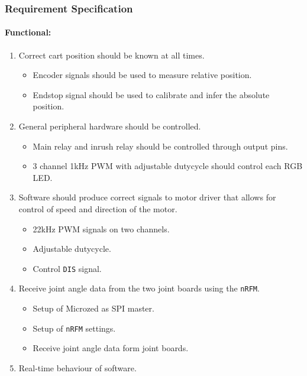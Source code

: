 \subsubsection{Requirement Specification} %
\label{ssub:controller_requirements}

\paragraph{Functional:}
\begin{enumerate}[resume]
	\item Correct cart position should be known at all times.
	\label{enum:correct_cart_position}
	\begin{itemize}
		\item Encoder signals should be used to measure relative position.
		\item Endstop signal should be used to calibrate and infer the absolute position.
	\end{itemize}
	\item General peripheral hardware should be controlled.
	\label{enum:general_peripheral_hardware}
	\begin{itemize}
		\item Main relay and inrush relay should be controlled through output pins.
		\item 3 channel 1kHz PWM with adjustable dutycycle should control each RGB LED.
	\end{itemize}
	\item Software should produce correct signals to motor driver that allows for control of speed and direction of the motor.
	\label{enum:software_correct_motor_driver_signals}
	\begin{itemize}
		\item 22kHz PWM signals on two channels.
		\item Adjustable dutycycle.
		\item Control \texttt{DIS} signal.
 	\end{itemize}
	\item Receive joint angle data from the two joint boards using the \texttt{nRFM}.
	\label{enum:receive_joint_angle}
	\begin{itemize}
		\item Setup of Microzed as SPI master.
		\item Setup of \texttt{nRFM} settings.
		\item Receive joint angle data form joint boards.
	\end{itemize}
	\item Real-time behaviour of software.
	\label{enum:real_time_behavior}
\end{enumerate}


